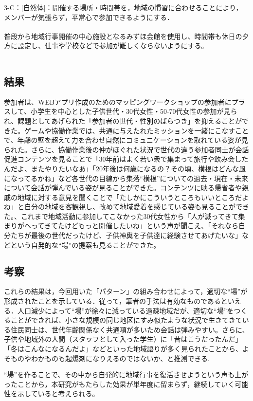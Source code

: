 \documentclass[a4paper]{jsarticle}
\begin{document}
3-C：[自然体]：開催する場所・時間帯を，地域の慣習に合わせることにより，メンバーが気張らず，平常心で参加できるようにする．\\\\
普段から地域行事開催の中心施設となるみずほ会館を使用し、時間帯も休日の夕方に設定し、仕事や学校などで参加が難しくならないようにする。\\\\
\subsection{結果}
参加者は、WEBアプリ作成のためのマッピングワークショップの参加者にプラスして、小学生を中心とした子供世代・30代女性・50-70代女性の参加が見られ、課題としてあげられた「参加者の世代・性別のばらつき」を抑えることができた。ゲームや協働作業では、共通に与えたれたミッションを一緒にこなすことで、年齢の壁を超えて力を合わせ自然にコミュニケーションを取れている姿が見られた。さらに、協働作業後の仲がほぐれた状況で世代の違う参加者同士が会話促進コンテンツを見ることで「30年前はよく若い衆で集まって旅行や飲み会したんだよ、またやりたいなあ」「20年後は何歳になるの？その頃、横根はどんな風になってるかね」など各世代の目線から集落“横根”についての過去・現在・未来について会話が弾んでいる姿が見ることができた。コンテンツに映る帰省者や親戚の地域に対する意見を聞くことで「たしかにこういうところもいいところだよね」と自分の地域を客観視し、改めて地域愛着を感じている姿も見ることができた。、これまで地域活動に参加してこなかった30代女性から「人が減ってきて集まりがへってきてたけどもっと開催したいね」という声が聞こえ、「それなら自分たちが最後の世代だったけど、子供神輿を子供達に経験させてあげたいな」などという自発的な“場”の提案も見ることができた。
\subsection{考察}
これらの結果は，今回用いた「パターン」の組み合わせによって，適切な“場”が形成されたことを示している．従って，筆者の手法は有効なものであるといえる．人口減少によって“場”が徐々に減っている過疎地域だが、適切な“場”をつくることができれば、小さな規模の同じ地区にすみ似たような状況で生きてきている住民同士は、世代年齢関係なく共通項が多いため会話は弾みやすい。さらに、子供や地域外の人間（スタッフとして入った学生）に「昔はこうだったんだ」「冬はこんなになるんだよ」などといった地域語りが多く見られたことから、よそものやわかものも起爆剤になりえるのではないか、と推測できる.\par“場”を作ることで、その中から自発的に地域行事を復活させようという声も上がったことから，本研究がもたらした効果が単年度に留まらず，継続していく可能性を示していると考えられる。
\newpage
\end{document}
